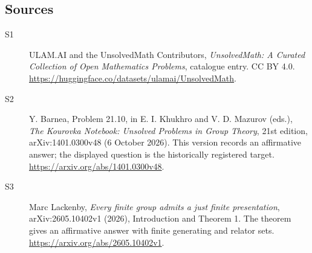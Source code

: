 \documentclass[11pt]{article}
\begin{document}
\subsection{Sources}
\begin{description}
\item[\hypertarget{source:statement:1}{S1}] ULAM.AI and the UnsolvedMath Contributors, \emph{UnsolvedMath: A Curated Collection of Open Mathematics Problems}, catalogue entry. CC BY 4.0. \url{https://huggingface.co/datasets/ulamai/UnsolvedMath}.
\item[\hypertarget{source:statement:2}{S2}] Y. Barnea, Problem 21.10, in E. I. Khukhro and V. D. Mazurov (eds.), \emph{The Kourovka Notebook: Unsolved Problems in Group Theory}, 21st edition, arXiv:1401.0300v48 (6 October 2026). This version records an affirmative answer; the displayed question is the historically registered target. \url{https://arxiv.org/abs/1401.0300v48}.
\item[\hypertarget{source:statement:3}{S3}] Marc Lackenby, \emph{Every finite group admits a just finite presentation}, arXiv:2605.10402v1 (2026), Introduction and Theorem 1. The theorem gives an affirmative answer with finite generating and relator sets. \url{https://arxiv.org/abs/2605.10402v1}.
\end{description}
\label{end:statement}
\end{document}

